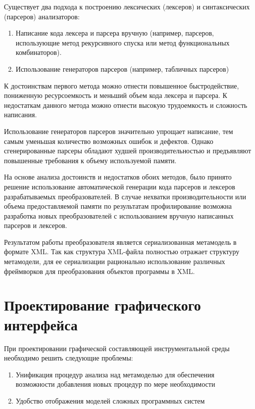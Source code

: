 Существует два подхода к построению лексических (лексеров) и синтаксических
(парсеров) анализаторов:

\begin{enumerate}
    \item Написание кода лексера и парсера вручную (например, парсеров,
    использующие метод рекурсивного спуска или метод функциональных
    комбинаторов).
    \item Использование генераторов парсеров (например, табличных парсеров)
\end{enumerate}

К достоинствам первого метода можно отнести повышенное быстродействие,
пониженную ресурсоемкость и меньший объем кода лексера и парсера. К недостаткам
данного метода можно отнести высокую трудоемкость и сложность написания.

Использование генераторов парсеров значительно упрощает написание, тем самым
уменьшая количество возможных ошибок и дефектов. Однако сгенерированные парсеры
обладают худшей производительностью и предъявляют повышенные требования к объему
используемой памяти.

На основе анализа достоинств и недостатков обоих методов, было принято решение
использование автоматической генерации кода парсеров и лексеров разрабатываемых
преобразователей. В случае нехватки производительности или объема
предоставляемой памяти по результатам профилирование возможна разработка новых
преобразователей с использованием вручную написанных парсеров и лексеров.

Результатом работы преобразователя является сериализованная метамодель в формате
XML. Так как структура XML-файла полностью отражает структуру метамодели, для ее
сериализации рационально использование различных фреймворков для преобразования
объектов программы в XML.

\section{Проектирование графического интерфейса}

При проектировании графической составляющей инструментальной среды необходимо
решить следующие проблемы:

\begin{enumerate}
    \item Унификация процедур анализа над метамоделью для обеспечения
    возможности добавления новых процедур по мере необходимости
    \item Удобство отображения моделей сложных программных систем
\end{enumerate}

